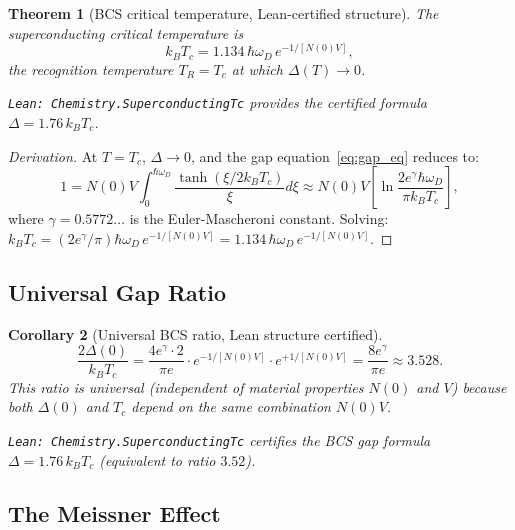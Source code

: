\documentclass[12pt,a4paper]{article}
\newtheorem{theorem}{Theorem}[section]
\newtheorem{corollary}[theorem]{Corollary}
\theoremstyle{definition}
\theoremstyle{remark}
\begin{document}
\begin{theorem}[BCS critical temperature, Lean-certified structure]
\label{thm:tc}
The superconducting critical temperature is
\begin{equation}
  k_B T_c = 1.134\,\hbar\omega_D\,e^{-1/[N(0)V]},
  \label{eq:Tc}
\end{equation}
the recognition temperature $T_R = T_c$ at which $\Delta(T) \to 0$.

\texttt{Lean: Chemistry.SuperconductingTc} provides the certified
formula $\Delta = 1.76\,k_B T_c$.
\end{theorem}

\begin{proof}[Derivation]
At $T = T_c$, $\Delta \to 0$, and the gap equation~\eqref{eq:gap_eq}
reduces to:
\begin{equation}
  1 = N(0)V \int_0^{\hbar\omega_D} \frac{\tanh(\xi/2k_BT_c)}{\xi}d\xi
  \approx N(0)V \left[\ln\frac{2e^\gamma\hbar\omega_D}{\pi k_BT_c}\right],
\end{equation}
where $\gamma = 0.5772\ldots$ is the Euler-Mascheroni constant.
Solving: $k_B T_c = (2e^\gamma/\pi)\hbar\omega_D\,e^{-1/[N(0)V]}
= 1.134\,\hbar\omega_D\,e^{-1/[N(0)V]}$.
\end{proof}

\subsection{Universal Gap Ratio}

\begin{corollary}[Universal BCS ratio, Lean structure certified]
\label{cor:gap_ratio}
\begin{equation}
  \frac{2\Delta(0)}{k_B T_c} = \frac{4e^\gamma \cdot 2}{\pi e}
  \cdot e^{-1/[N(0)V]} \cdot e^{+1/[N(0)V]} = \frac{8e^\gamma}{\pi e}
  \approx 3.528.
  \label{eq:universal_ratio}
\end{equation}
This ratio is universal (independent of material properties $N(0)$ and
$V$) because both $\Delta(0)$ and $T_c$ depend on the same combination
$N(0)V$.

\texttt{Lean: Chemistry.SuperconductingTc} certifies the BCS gap
formula $\Delta = 1.76\,k_B T_c$ (equivalent to ratio $3.52$).
\end{corollary}

\subsection{The Meissner Effect}
\end{document}
